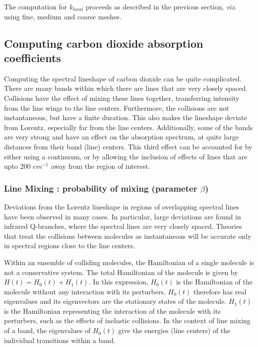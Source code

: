 \documentclass[11pt]{article}
\begin{document}
The computation for $k_{local}$ proceeds as described in the previous 
section, {\em viz.} using fine, medium and coarse meshes.

\subsection{Computing carbon dioxide absorption coefficients}

Computing the spectral lineshape of carbon dioxide can be quite complicated.
There are many bands within which there are lines that are very closely 
spaced. Collisions have the effect of mixing these lines together,
transferring intensity from the line wings to the line centers. Furthermore,
the  collisions are not instantaneous, but have a finite duration. This 
also makes the lineshape deviate from Lorentz, especially far from the line
centers. Additionally, some of the bands are very strong and have an 
effect on the absorption spectrum, at
quite large distances from their band (line) centers. This third effect can
be accounted for by either using a continuum, or by allowing the inclusion
of effects of lines that are upto 200 $cm^{-1}$ away from the region of 
interest.

\subsubsection{Line Mixing : probability of mixing (parameter $\beta$)}

Deviations from the Lorentz lineshape in regions of overlapping spectral
lines have been observed in many cases. In particular, large deviations are
found in infrared Q-branches, where the spectral lines are very closely 
spaced.  Theories that treat the collisions between molecules as 
instantaneous will be accurate only in spectral regions close to the 
line centers.  

Within an ensemble of colliding molecules, the Hamiltonian of a single 
molecule is not a conservative system.  The total Hamiltonian 
of the molecule is given by $H(t)=H_{0}(t)+ H_{1}(t)$.  In this
expression, $H_{0}(t)$ is the Hamiltonian of the molecule without any
interaction with its perturbers.  $H_{0}(t)$ therefore has real eigenvalues
and its eigenvectors are the stationary states of the molecule.  
$H_{1}(t)$ is the Hamiltonian representing the interaction of the molecule
with its perturbers, such as the effects of inelastic collisions.  
In the context of line mixing of a band, the eigenvalues of $H_{0}(t)$ give
the energies (line centers) of the individual transitions within a band.
\end{document}
